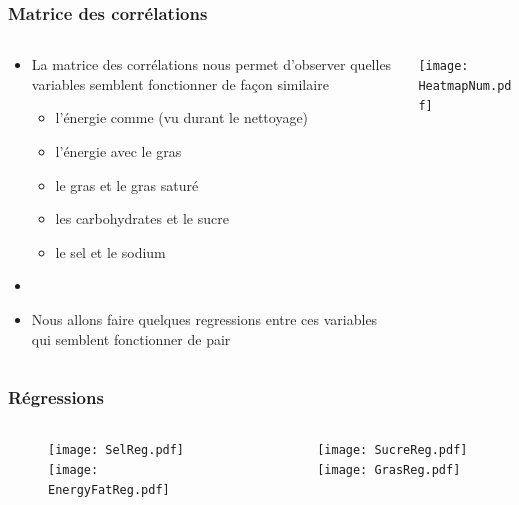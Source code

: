 \subsubsection{Matrice des corrélations}
\begin{frame}{\insertsubsubsection}
  \begin{columns}
    \begin{column}{.5\textwidth}
      \begin{itemize}
        \item La matrice des corrélations nous permet d'observer quelles variables
              semblent fonctionner de façon similaire
              \begin{itemize}
                \item l'énergie comme (vu durant le nettoyage)
                \item l'énergie avec le gras
                \item le gras et le gras saturé
                \item les carbohydrates et le sucre
                \item le sel et le sodium
              \end{itemize}
        \item[]
        \item Nous allons faire quelques regressions entre ces variables qui semblent fonctionner
              de pair
      \end{itemize}
    \end{column}
    \begin{column}{.5\textwidth}
      \texttt{[image: HeatmapNum.pdf]}
    \end{column}
  \end{columns}
\end{frame}

\subsubsection{Régressions}
\begin{frame}{\insertsubsubsection}
  \begin{columns}
    \begin{column}{.5\textwidth}
      \begin{figure}
        \texttt{[image: SelReg.pdf]}
        \texttt{[image: EnergyFatReg.pdf]}
      \end{figure}
    \end{column}
    \begin{column}{.5\textwidth}
      \begin{figure}
        \texttt{[image: SucreReg.pdf]}
        \texttt{[image: GrasReg.pdf]}
      \end{figure}
    \end{column}
  \end{columns}
\end{frame}

